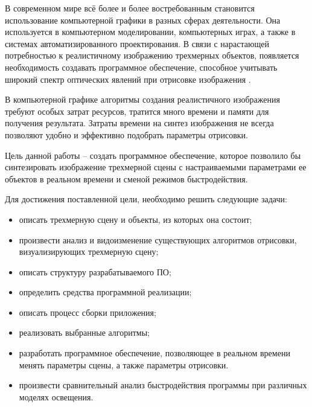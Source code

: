 \Introduction

В современном мире всё более и более востребованным становится использование компьютерной графики в разных сферах деятельности. Она используется в компьютерном моделировании, компьютерных играх, а также в системах автоматизированного проектирования. В связи с нарастающей потребностью к реалистичному изображению трехмерных объектов, появляется необходимость создавать программное обеспечение, способное учитывать широкий спектр оптических явлений при отрисовке изображения \cite{intro}.

В компьютерной графике алгоритмы создания реалистичного изображения требуют особых затрат ресурсов, тратится много времени и памяти для получения результата. Затраты времени на синтез изображения не всегда позволяют удобно и эффективно подобрать параметры отрисовки.

Цель данной работы – создать программное обеспечение, которое позволило бы синтезировать изображение трехмерной сцены с настраиваемыми параметрами ее объектов в реальном времени и сменой режимов быстродействия.

Для достижения поставленной цели, необходимо решить следующие задачи:

\begin{itemize}[$\bullet$]
	\item описать трехмерную сцену и объекты, из которых она состоит;
	\item произвести анализ и видоизменение существующих алгоритмов отрисовки, визуализирующих трехмерную сцену;
	\item описать структуру разрабатываемого ПО;
	\item определить средства программной реализации;
	\item описать процесс сборки приложения;
	\item реализовать выбранные алгоритмы;
	\item разработать программное обеспечение, позволяющее в реальном времени менять параметры сцены, а также параметры отрисовки.
	\item произвести сравнительный анализ быстродействия программы при различных моделях освещения.
\end{itemize}
